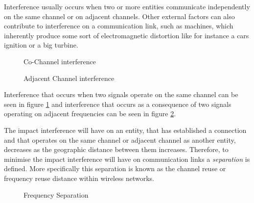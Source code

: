 Interference usually occurs when two or more entities communicate independently on the same channel or on adjacent channels\cite{WirelessCommunications,WirelessDigitalCommunications}. Other external factors can also contribute to interference on a communication link, such as machines, which inherently produce some sort of electromagnetic distortion like for instance a cars ignition or a big turbine\cite{WirelessCommunications,WirelessDigitalCommunications}. 
\begin{figure}[t!]
	\begin{centering}
	
	\label{fig:sameinterference}
	\caption{Co-Channel interference}
	\end{centering}
\end{figure}

\begin{figure}[bp!]
	\begin{centering}
	
	\label{fig:adjacentinterference}
	\caption{Adjacent Channel interference}
	\end{centering}
\end{figure}
Interference that occurs when two signals operate on the same channel can be seen in figure \ref{fig:sameinterference} and interference that occurs as a consequence of two signals operating on adjacent frequencies can be seen in figure \ref{fig:adjacentinterference}.

The impact interference will have on an entity, that has established a connection and that operates on the same channel or adjacent channel as another entity, decreases as the geographic distance between them increases\cite{WirelessCommunications,WirelessDigitalCommunications,Eisenblatter,InterferenceOrientatedFAP}. Therefore, to minimise the impact interference will have on communication links a \emph{separation} is defined\cite{WirelessCommunications,WirelessDigitalCommunications,Eisenblatter,InterferenceOrientatedFAP}. More specifically this separation is known as the channel reuse or frequency reuse distance within wireless networks\cite{WirelessCommunications,WirelessDigitalCommunications,Eisenblatter,InterferenceOrientatedFAP}.

\begin{figure}[t!]
	\begin{centering}
	
	\caption{Frequency Separation}
	\label{fig:seperationgraph}
	\end{centering}
\end{figure}

